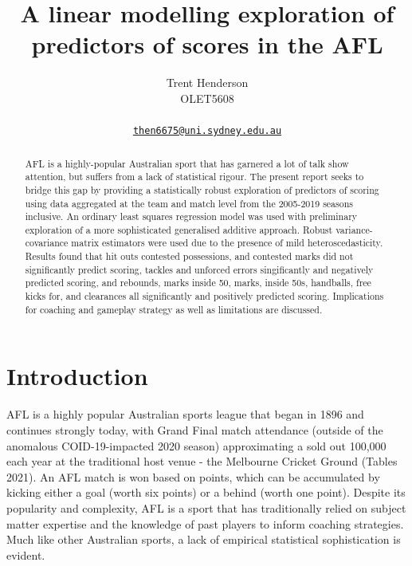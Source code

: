 \documentclass{article}
\title{A linear modelling exploration of predictors of scores in the AFL}
\author{
    Trent Henderson
   \\
    OLET5608 \\
   \\
  \texttt{\href{mailto:then6675@uni.sydney.edu.au}{\nolinkurl{then6675@uni.sydney.edu.au}}} \\
  }
\begin{document}
\maketitle

\def\tightlist{}


\begin{abstract}
AFL is a highly-popular Australian sport that has garnered a lot of talk show attention, but suffers from a lack of statistical rigour. The present report seeks to bridge this gap by providing a statistically robust exploration of predictors of scoring using data aggregated at the team and match level from the 2005-2019 seasons inclusive. An ordinary least squares regression model was used with preliminary exploration of a more sophisticated generalised additive approach. Robust variance-covariance matrix estimators were used due to the presence of mild heteroscedasticity. Results found that hit outs contested possessions, and contested marks did not significantly predict scoring, tackles and unforced errors singificantly and negatively predicted scoring, and rebounds, marks inside 50, marks, inside 50s, handballs, free kicks for, and clearances all significantly and positively predicted scoring. Implications for coaching and gameplay strategy as well as limitations are discussed.
\end{abstract}


\hypertarget{introduction}{%
\section{Introduction}\label{introduction}}

AFL is a highly popular Australian sports league that began in 1896 and continues strongly today, with Grand Final match attendance (outside of the anomalous COID-19-impacted 2020 season) approximating a sold out 100,000 each year at the traditional host venue - the Melbourne Cricket Ground (Tables 2021). An AFL match is won based on points, which can be accumulated by kicking either a goal (worth six points) or a behind (worth one point). Despite its popularity and complexity, AFL is a sport that has traditionally relied on subject matter expertise and the knowledge of past players to inform coaching strategies. Much like other Australian sports, a lack of empirical statistical sophistication is evident.
\end{document}

